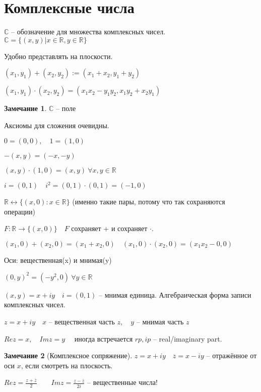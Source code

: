 \documentclass{book}
\newcommand\R{\ensuremath{\mathbb{R}}}
\renewcommand\C{\ensuremath{\mathbb{C}}}
\newcommand{\ov}[1]{\overline{#1}}
\theoremstyle{definition}
\newtheorem*{note}{Замечание}
\begin{document}
    \section{Комплексные числа}
    $\C$ -- обозначение для множества комплексных чисел. \\
    $\C = \{(x,y)|x\in \R, y\in \R\}$

    Удобно представлять на плоскости.

    $(x_1,y_1) + (x_2,y_2) := (x_1+x_2,y_1+y_2)$

    $(x_1,y_1)\cdot (x_2,y_2) = (x_1x_2-y_1y_2,x_1y_2+x_2y_1) $
    \begin{note}
        $\C$ -- поле

        Аксиомы для сложения очевидны.

        $0 = (0,0), \quad 1 = (1,0)$

        $-(x,y) = (-x,-y)$

        $(x,y) \cdot  (1,0) = (x,y)\ \forall x, y\in \R$

        $i = (0,1)\quad i^2 = (0,1) \cdot  (0,1) = (-1,0)$
    \end{note}

    $\R \leftrightarrow \{(x,0) : x\in \R\}$ (именно такие пары, потому что так сохраняются операции)

    $F: \R \to \{(x,0)\}\quad F$ сохраняет + и сохраняет $\cdot$. 

    $(x_1,0) + (x_2,0) = (x_1+x_2,0) \quad  (x_1, 0) \cdot  (x_2,0) = (x_1x_2-0,0)$


    Оси: вещественная(x) и мнимая(y)

    $(0,y)^2 = (-y^2,0)\ \forall y\in \R$

    $(x,y) = x+iy\quad i = (0,1)$ -- мнимая единица. 
    Алгебраическая форма записи комплексных чисел.

    $z = x+iy\quad x$ -- вещественная часть $z,\quad y$ -- мнимая часть $z$

    $Re z = x,\quad Im z = y\quad $ иногда встречается $rp, ip$ -- real/imaginary part.

    \begin{note}
        [Комплексное сопряжение]
        $z = x+iy\quad \ov z = x-iy$ -- отражённое от оси $x$, если смотреть на плоскость.

        $Re z = \frac{z+\ov z}{2}\qquad Im z = \frac{z-\ov z}{2i}$ -- вещественные числа!
    \end{note}
\end{document}
